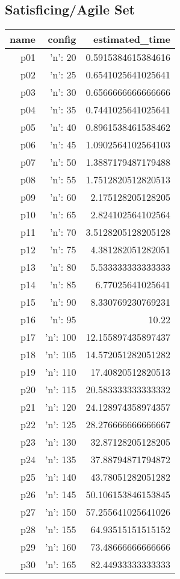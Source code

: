 \documentclass{article}
\begin{document}
                                \subsection*{Satisficing/Agile Set}
                                
                            \begin{center}
                            \scriptsize
                            \begin{tabular}{r|r|r}
                            name & config & estimated\_time\\\midrule
                              p01&{'n': 20}&0.5915384615384616\\
  p02&{'n': 25}&0.6541025641025641\\
  p03&{'n': 30}&0.6566666666666666\\
  p04&{'n': 35}&0.7441025641025641\\
  p05&{'n': 40}&0.8961538461538462\\
  p06&{'n': 45}&1.0902564102564103\\
  p07&{'n': 50}&1.3887179487179488\\
  p08&{'n': 55}&1.7512820512820513\\
  p09&{'n': 60}&2.175128205128205\\
  p10&{'n': 65}&2.824102564102564\\
  p11&{'n': 70}&3.5128205128205128\\
  p12&{'n': 75}&4.381282051282051\\
  p13&{'n': 80}&5.533333333333333\\
  p14&{'n': 85}&6.77025641025641\\
  p15&{'n': 90}&8.330769230769231\\
  p16&{'n': 95}&10.22\\
  p17&{'n': 100}&12.155897435897437\\
  p18&{'n': 105}&14.572051282051282\\
  p19&{'n': 110}&17.40820512820513\\
  p20&{'n': 115}&20.583333333333332\\
  p21&{'n': 120}&24.128974358974357\\
  p22&{'n': 125}&28.276666666666667\\
  p23&{'n': 130}&32.87128205128205\\
  p24&{'n': 135}&37.88794871794872\\
  p25&{'n': 140}&43.78051282051282\\
  p26&{'n': 145}&50.106153846153845\\
  p27&{'n': 150}&57.255641025641026\\
  p28&{'n': 155}&64.93515151515152\\
  p29&{'n': 160}&73.48666666666666\\
  p30&{'n': 165}&82.44933333333333
                            \end{tabular}
                            \end{center}
                    
\end{document}
